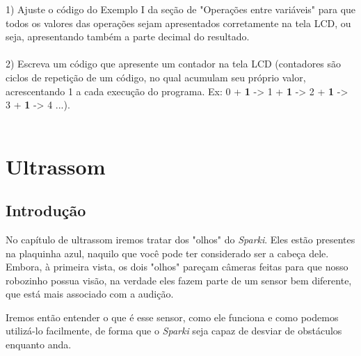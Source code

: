 \documentclass[conference]{IEEEtran}
\begin{document}
    1) Ajuste o código do Exemplo I da seção de "Operações entre variáveis" para que todos os valores das operações sejam apresentados corretamente na tela LCD, ou seja, apresentando também a parte decimal do resultado.
    \\
    \\
    2) Escreva um código que apresente um contador na tela LCD (contadores são ciclos de repetição de um código, no qual acumulam seu próprio valor, acrescentando 1 a cada execução do programa. Ex: 0 + \textbf{1} -> 1 + \textbf{1} -> 2 + \textbf{1} -> 3 + \textbf{1} -> 4 ...).
    \\
    \\

    \section{\textbf{Ultrassom}}
\begin{center}
    \subsection{Introdução}    
\end{center}
    \par
    No capítulo de ultrassom iremos tratar dos "olhos" do \textit{Sparki}. Eles estão presentes na plaquinha azul, naquilo que você pode ter considerado ser a cabeça dele. Embora, à primeira vista, os dois "olhos" pareçam câmeras feitas para que nosso robozinho possua visão, na verdade eles fazem parte de um sensor bem diferente, que está mais associado com a audição.
    \par
    Iremos então entender o que é esse sensor, como ele funciona e como podemos utilizá-lo facilmente, de forma que o \textit{Sparki} seja capaz de desviar de obstáculos enquanto anda. 
    
\end{document}
